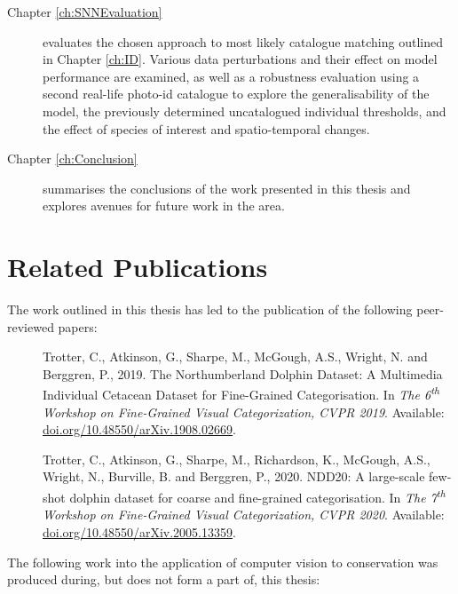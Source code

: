 \begin{description}
	\item[Chapter \ref{ch:SNNEvaluation}] evaluates the chosen approach to most likely catalogue matching outlined in Chapter \ref{ch:ID}. Various data perturbations and their effect on model performance are examined, as well as a robustness evaluation using a second real-life photo-id catalogue to explore the generalisability of the model, the previously determined uncatalogued individual thresholds, and the effect of species of interest and spatio-temporal changes.
	
	\item[Chapter \ref{ch:Conclusion}] summarises the conclusions of the work presented in this thesis and explores avenues for future work in the area.  
	 
\end{description}

\newpage

\section{Related Publications}\label{ch:intro,relatedPublications}

The work outlined in this thesis has led to the publication of the following peer-reviewed papers:

\begin{description}
	\item[\cite{trotter_northumberland_2019}] Trotter, C., Atkinson, G., Sharpe, M., McGough, A.S., Wright, N. and Berggren, P., 2019. The Northumberland Dolphin Dataset: A Multimedia Individual Cetacean Dataset for Fine-Grained Categorisation. In \textit{The 6\textsuperscript{th} Workshop on Fine-Grained Visual Categorization, CVPR 2019}. Available: \href{https://doi.org/10.48550/arXiv.1908.02669}{doi.org/10.48550/arXiv.1908.02669}.
	
	\item[\cite{trotter_ndd20_2020}] Trotter, C., Atkinson, G., Sharpe, M., Richardson, K., McGough, A.S., Wright, N., Burville, B. and Berggren, P., 2020. NDD20: A large-scale few-shot dolphin dataset for coarse and fine-grained categorisation. In \textit{The 7\textsuperscript{th} Workshop on Fine-Grained Visual Categorization, CVPR 2020}. Available: \href{https://doi.org/10.48550/arXiv.2005.13359}{doi.org/10.48550/arXiv.2005.13359}.
\end{description}

\noindent The following work into the application of computer vision to conservation was produced during, but does not form a part of, this thesis:

